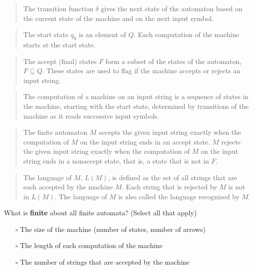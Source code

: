 \documentclass[12pt, oneside]{article}
\begin{document}
\begin{quote}
The transition function $\delta$ gives the next state of the automaton based on the current state of 
the machine and on the next input symbol.
\end{quote}

\begin{quote}
The start state $q_0$ is an element of $Q$.  Each computation of the machine starts at the  start  state.
\end{quote}

\begin{quote}
The accept (final) states $F$ form a subset of the states of the automaton, $F \subseteq  Q$. 
These states are used to flag if the machine accepts or rejects an input string.
\end{quote}


\begin{quote}
The computation of a machine on an input string is a sequence of states
in the machine,  starting with the start state, determined by transitions 
of the machine as it reads successive input symbols.
\end{quote}

\begin{quote}
The finite automaton $M$ accepts the given input string exactly when the computation of $M$ on the input string
ends in an accept state. $M$ rejects the given input string exactly when the computation of 
$M$ on the input string ends in a nonaccept state, that is, a state that is not in $F$.
\end{quote}

\begin{quote} 
The language of $M$, $L(M)$, is defined as the set of  all strings that are each accepted 
by the machine $M$. Each string that is rejected by $M$ is not in $L(M)$.
The language of $M$ is also called the language recognized by $M$.
\end{quote}   
   
What is {\bf finite} about all finite automata? (Select all that apply)
\begin{itemize}
   \item[$\square$] The size of the machine (number of states, number of arrows)
   \item[$\square$] The length of each computation of the machine
   \item[$\square$] The number of strings that are accepted by the machine
\end{itemize}
  
\end{document}
